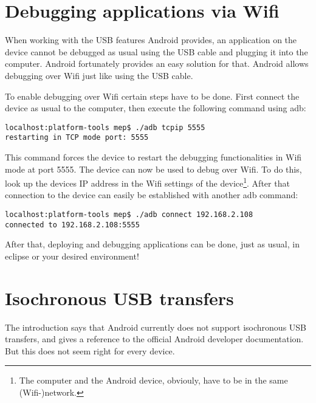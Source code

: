 \chapter{Debugging applications via Wifi}
\label{chapter:DetailedDescriptions}

When working with the USB features Android provides, an application on the device cannot be debugged as usual using the USB cable and plugging it into the computer. Android fortunately provides an easy solution for that. Android allows debugging over Wifi just like using the USB cable.

To enable debugging over Wifi certain steps have to be done. First connect the device as usual to the computer, then execute the following command using adb:

\lstset{language=bash}
\begin{lstlisting}[caption=Restart the device in Wifi debug mode, label=listing:wifi_debug]
localhost:platform-tools mep$ ./adb tcpip 5555
restarting in TCP mode port: 5555
\end{lstlisting}

This command forces the device to restart the debugging functionalities in Wifi mode at port 5555. The device can now be used to debug over Wifi. To do this, look up the devices IP address in the Wifi settings of the device\footnote{The computer and the Android device, obviouly, have to be in the same (Wifi-)network.}. After that connection to the device can easily be established with another adb command:

 \begin{lstlisting}[caption=Connect to the device over Wifi, label=listing:wifi_connect]
localhost:platform-tools mep$ ./adb connect 192.168.2.108
connected to 192.168.2.108:5555
 \end{lstlisting}
 
 After that, deploying and debugging applications can be done, just as usual, in eclipse or your desired environment!

\chapter{Isochronous USB transfers}

The introduction says that Android currently does not support isochronous USB transfers, and gives a reference to the official Android developer documentation\cite{android_usb_constants}. But this does not seem right for every device.


